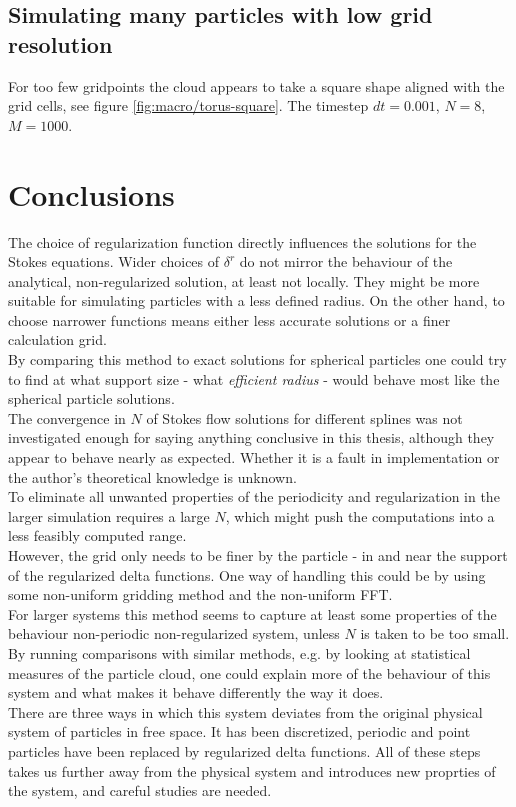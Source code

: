 \documentclass[a4paper,
twoside=false,abstract=false,numbers=noenddot,
titlepage=false,headings=small,parskip=half,version=last]{scrartcl}
\begin{document}
\subsection{Simulating many particles with low grid resolution}
For too few gridpoints the cloud appears to take a square shape aligned with the grid cells, see figure \ref{fig:macro/torus-square}. The timestep $dt=0.001$, $N=8$, $M=1000$.

\section{Conclusions}
The choice of regularization function directly influences the solutions for the Stokes equations.
Wider choices of $\delta^r$ do not mirror the behaviour of the analytical, non-regularized solution, at least not locally.
They might be more suitable for simulating particles with a less defined radius.
On the other hand, to choose narrower functions means either less accurate solutions or a finer calculation grid.\\
By comparing this method to exact solutions for spherical particles one could try to find at what support size - what \emph{efficient radius} - would behave most like the spherical particle solutions.\\
The convergence in $N$ of Stokes flow solutions for different splines was not investigated enough for saying anything conclusive in this thesis, although they appear to behave nearly as expected. Whether it is a fault in implementation or the author's theoretical knowledge is unknown.\\
To eliminate all unwanted properties of the periodicity and regularization in the larger simulation requires a large $N$, which might push the computations into a less feasibly computed range.\\
However, the grid only needs to be finer by the particle - in and near the support of the regularized delta functions.
One way of handling this could be by using some non-uniform gridding method and the non-uniform FFT.\\
For larger systems this method seems to capture at least some properties of the behaviour non-periodic non-regularized system, unless $N$ is taken to be too small. By running comparisons with similar methods, e.g. by looking at statistical measures of the particle cloud, one could explain more of the behaviour of this system and what makes it behave differently the way it does.\\
There are three ways in which this system deviates from the original physical system of particles in free space. It has been discretized, periodic and point particles have been replaced by regularized delta functions. All of these steps takes us further away from the physical system and introduces new proprties of the system, and careful studies are needed.



\end{document}
